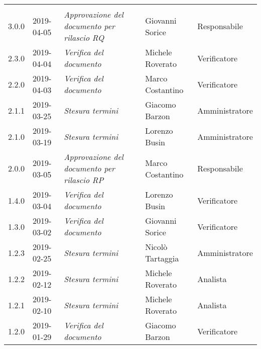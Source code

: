 \newpage 
\section*{}
	\begin{longtable}{C{2cm}|C{2.5cm}|C{4.5cm}|C{2.5cm}|C{3cm}}
		
		 &  &  &  &   \\
		\endhead
		
		3.0.0 & 2019-04-05 & \emph{Approvazione del documento per rilascio RQ} & Giovanni Sorice & Responsabile  \\
		\hline
		
		2.3.0 & 2019-04-04 & \emph{Verifica del documento} & Michele Roverato & Verificatore \\
		\hline
		
		2.2.0 & 2019-04-03 & \emph{Verifica del documento} & Marco Costantino & Verificatore \\
		\hline
		
		2.1.1 & 2019-03-25 & \emph{Stesura termini} & Giacomo Barzon & Amministratore \\
		\hline
		
		2.1.0 & 2019-03-19 & \emph{Stesura termini} & Lorenzo Busin & Amministratore \\
		\hline
	
		2.0.0 & 2019-03-05 & \emph{Approvazione del documento per rilascio RP} & Marco Costantino & Responsabile  \\
		\hline
		
		1.4.0 & 2019-03-04 & \emph{Verifica del documento} & Lorenzo Busin & Verificatore \\
		\hline
		
		1.3.0 & 2019-03-02 & \emph{Verifica del documento} & Giovanni Sorice & Verificatore \\
		\hline
	
		1.2.3 & 2019-02-25 & \emph{Stesura termini} & Nicolò Tartaggia & Amministratore \\
		\hline
	
		1.2.2 & 2019-02-12 & \emph{Stesura termini} & Michele Roverato & Analista \\
		\hline
	
		1.2.1 & 2019-02-10 & \emph{Stesura termini} & Michele Roverato & Analista \\
		\hline
	
		1.2.0 & 2019-01-29 & \emph{Verifica del documento} & Giacomo Barzon & Verificatore \\
		\hline
	

\end{longtable}
